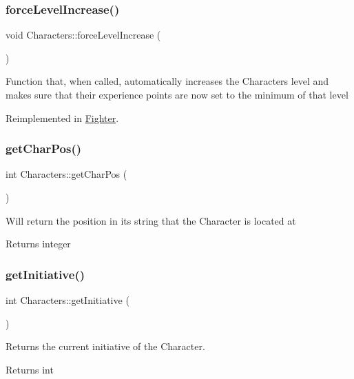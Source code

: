 \subsubsection{\texorpdfstring{force\+Level\+Increase()}{forceLevelIncrease()}}
{\footnotesize\ttfamily void Characters\+::force\+Level\+Increase (\begin{DoxyParamCaption}{ }\end{DoxyParamCaption})\hspace{0.3cm}{\ttfamily [virtual]}}

Function that, when called, automatically increases the Character\textquotesingle{}s level and makes sure that their experience points are now set to the minimum of that level 

Reimplemented in \hyperlink{class_fighter_a774a40f8466eec10bee12b02e43e0aad}{Fighter}.

\hypertarget{class_characters_acaffff77a9e5713dec43ca2563cfe4dd}{}\label{class_characters_acaffff77a9e5713dec43ca2563cfe4dd} 
\subsubsection{\texorpdfstring{get\+Char\+Pos()}{getCharPos()}}
{\footnotesize\ttfamily int Characters\+::get\+Char\+Pos (\begin{DoxyParamCaption}{ }\end{DoxyParamCaption})}

Will return the position in its string that the Character is located at \begin{DoxyReturn}{Returns}
integer 
\end{DoxyReturn}
\hypertarget{class_characters_af37c83d77c4c29f8f6ac230474e0177a}{}\label{class_characters_af37c83d77c4c29f8f6ac230474e0177a} 
\subsubsection{\texorpdfstring{get\+Initiative()}{getInitiative()}}
{\footnotesize\ttfamily int Characters\+::get\+Initiative (\begin{DoxyParamCaption}{ }\end{DoxyParamCaption})}

Returns the current initiative of the Character. \begin{DoxyReturn}{Returns}
int 
\end{DoxyReturn}
\hypertarget{class_characters_a498fb8e0caaa6503fbb1e1694a082c4c}{}\label{class_characters_a498fb8e0caaa6503fbb1e1694a082c4c} 
